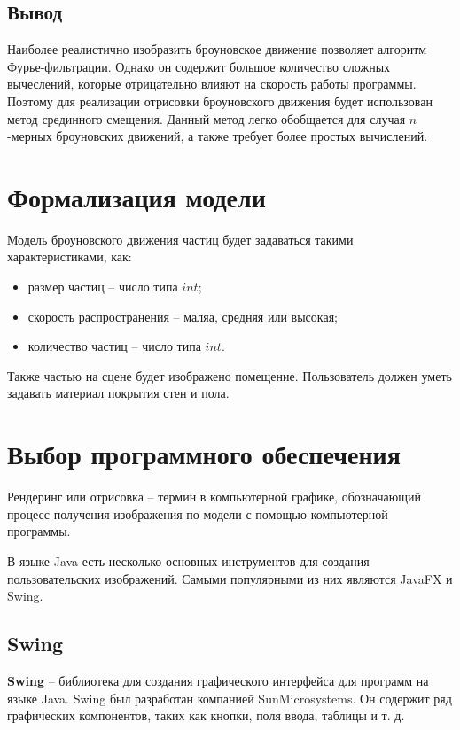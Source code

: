 \subsection*{Вывод}

Наиболее реалистично изобразить броуновское движение позволяет алгоритм Фурье-фильтрации. Однако он содержит большое количество сложных вычеслений, которые отрицательно влияют на скорость работы программы. Поэтому для реализации отрисовки броуновского движения будет использован метод срединного смещения. Данный метод легко обобщается для случая $n$-мерных броуновских движений, а также требует более простых вычислений.

\newpage

\section{Формализация модели}
Модель броуновского движения частиц будет задаваться такими характеристиками, как:
\begin{itemize} 
    \item размер частиц -- число типа $int$;
    \item скорость распространения -- маляа, средняя или высокая;
    \item количество частиц -- число типа $int$.
\end{itemize}

Также частью на сцене будет изображено помещение. Пользователь должен уметь задавать материал покрытия стен и пола.


\section{Выбор программного обеспечения}

Рендеринг или отрисовка -- термин в компьютерной графике, обозначающий процесс получения изображения по модели с помощью компьютерной программы.

В языке Java есть несколько основных инструментов для создания пользовательских изображений. Самыми популярными из них являются JavaFX и Swing.

\subsection{Swing}

\textbf{Swing} -- библиотека для создания графического интерфейса для программ на языке Java. Swing был разработан компанией SunMicrosystems. Он содержит ряд графических компонентов, таких как кнопки, поля ввода, таблицы и т. д.

